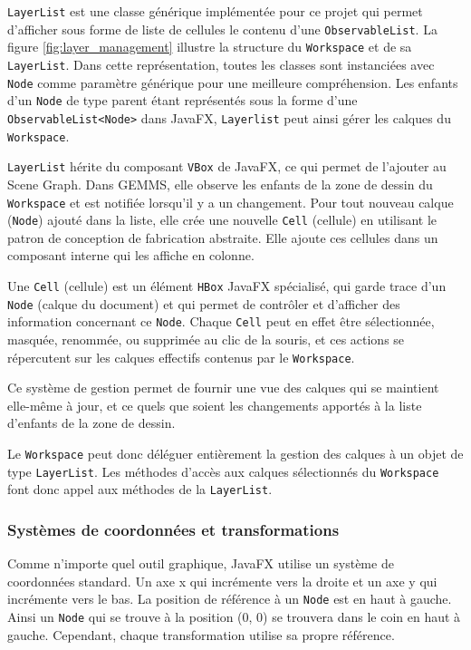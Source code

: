 \texttt{LayerList} est une classe générique implémentée pour ce projet qui permet d'afficher sous forme de liste de cellules le contenu d'une \texttt{ObservableList}. La figure \ref{fig:layer_management} illustre la structure du \texttt{Workspace} et de sa \texttt{LayerList}. Dans cette représentation, toutes les classes sont instanciées avec \texttt{Node} comme paramètre générique pour une meilleure compréhension. Les enfants d'un \texttt{Node} de type parent étant représentés sous la forme d'une \texttt{ObservableList<Node>} dans JavaFX, \texttt{Layerlist} peut ainsi gérer les calques du \texttt{Workspace}.

\texttt{LayerList} hérite du composant \texttt{VBox} de JavaFX, ce qui permet de l'ajouter au Scene Graph. Dans GEMMS, elle observe les enfants de la zone de dessin du \texttt{Workspace} et est notifiée lorsqu'il y a un changement. Pour tout nouveau calque (\texttt{Node}) ajouté dans la liste, elle crée une nouvelle \texttt{Cell} (cellule) en utilisant le patron de conception de fabrication abstraite. Elle ajoute ces cellules dans un composant interne qui les affiche en colonne.

Une \texttt{Cell} (cellule) est un élément \texttt{HBox} JavaFX spécialisé, qui garde trace d'un \texttt{Node} (calque du document) et qui permet de contrôler et d'afficher des information concernant ce \texttt{Node}. Chaque \texttt{Cell} peut en effet être sélectionnée, masquée, renommée, ou supprimée au clic de la souris, et ces actions se répercutent sur les calques effectifs contenus par le \texttt{Workspace}. 

Ce système de gestion permet de fournir une vue des calques qui se maintient elle-même à jour, et ce quels que soient les changements apportés à la liste d'enfants de la zone de dessin.

Le \texttt{Workspace} peut donc déléguer entièrement la gestion des calques à un objet de type \texttt{LayerList}. Les méthodes d'accès aux calques sélectionnés du \texttt{Workspace} font donc appel aux méthodes de la \texttt{LayerList}.



\subsubsection{Systèmes de coordonnées et transformations}
Comme n'importe quel outil graphique, JavaFX utilise un système de coordonnées standard. Un axe x qui incrémente vers la droite et un axe y qui incrémente vers le bas. La position de référence à un \texttt{Node} est en haut à gauche. Ainsi un \texttt{Node} qui se trouve à la position (0, 0) se trouvera dans le coin en haut à gauche. Cependant, chaque transformation utilise sa propre référence.

